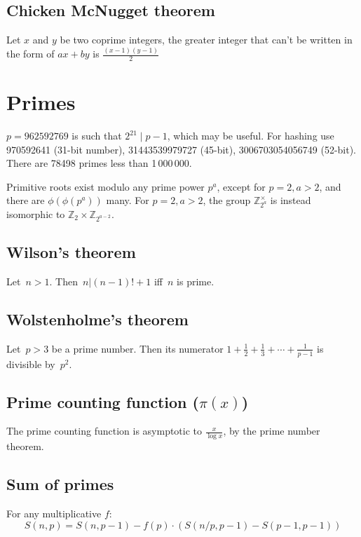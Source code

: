\subsection{Chicken McNugget theorem}
	Let $x$ and $y$ be two coprime integers, the greater integer that can't be written in the form of $ax + by$ is $\frac{(x-1)(y-1)}{2}$



\section{Primes}
	$p=962592769$ is such that $2^{21} \mid p-1$, which may be useful. For hashing
	use 970592641 (31-bit number), 31443539979727 (45-bit), 3006703054056749
	(52-bit). There are 78498 primes less than 1\,000\,000.

	Primitive roots exist modulo any prime power $p^a$, except for $p = 2, a > 2$, and there are $\phi(\phi(p^a))$ many.
	For $p = 2, a > 2$, the group $\mathbb Z_{2^a}^\times$ is instead isomorphic to $\mathbb Z_2 \times \mathbb Z_{2^{a-2}}$.

\subsection{Wilson's theorem}
Let~$n > 1$. Then~$n|(n-1)!+1$ iff~$n$ is prime.


\subsection{Wolstenholme's theorem}
Let~$p > 3$ be a prime number. Then its numerator $ 1 + \frac{1}{2}+\frac{1}{3}+\cdots+\frac{1}{p-1} $
is divisible by~$p^2$.

\subsection{Prime counting function ($\pi(x)$)} The prime counting function is asymptotic to $\frac{x}{\log x}$, by the prime number theorem.
      
\subsection{Sum of primes} For any multiplicative $f$:
                \[ S(n,p) = S(n, p-1) - f(p) \cdot (S(n/p,p-1) - S(p-1,p-1))\]

